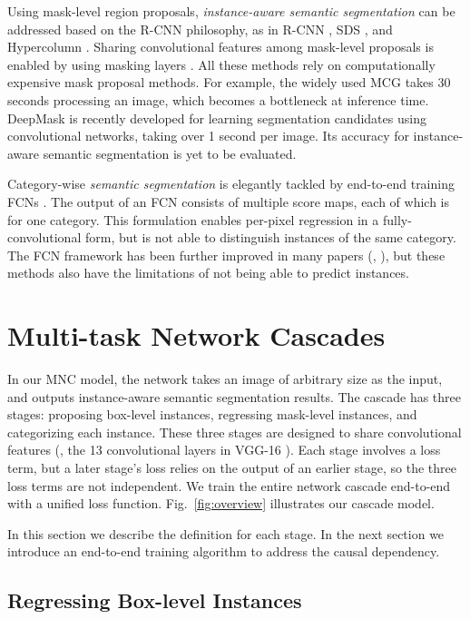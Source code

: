 \documentclass[10pt,twocolumn,letterpaper]{article}
\begin{document}
Using mask-level region proposals, \emph{instance-aware semantic segmentation} can be addressed based on the R-CNN philosophy, as in R-CNN \cite{Girshick2014}, SDS \cite{Hariharan2014}, and Hypercolumn \cite{Hariharan2015}. Sharing convolutional features among mask-level proposals is enabled by using masking layers \cite{Dai2015}. All these methods \cite{Girshick2014,Hariharan2014,Hariharan2015,Dai2015} rely on computationally expensive mask proposal methods. For example, the widely used MCG \cite{Arbelaez2014} takes 30 seconds processing an image, which becomes a bottleneck at inference time. DeepMask \cite{Pinheiro2015} is recently developed for learning segmentation candidates using convolutional networks, taking over 1 second per image. Its accuracy for instance-aware semantic segmentation is yet to be evaluated.

Category-wise \emph{semantic segmentation} is elegantly tackled by end-to-end training FCNs \cite{Long2015}. The output of an FCN consists of multiple score maps, each of which is for one category. This formulation enables per-pixel regression in a fully-convolutional form, but is not able to distinguish instances of the same category. The FCN framework has been further improved in many papers (\eg, \cite{Chen2015,Zheng2015}), but these methods also have the limitations of not being able to predict instances.

\section{Multi-task Network Cascades}

In our MNC model, the network takes an image of arbitrary size as the input, and outputs instance-aware semantic segmentation results. The cascade has three stages: proposing box-level instances, regressing mask-level instances, and categorizing each instance.
These three stages are designed to share convolutional features (\eg, the 13 convolutional layers in VGG-16 \cite{Simonyan2015}).
Each stage involves a loss term, but a later stage's loss relies on the output of an earlier stage, so the three loss terms are not independent. We train the entire network cascade end-to-end with a unified loss function.
Fig.~\ref{fig:overview} illustrates our cascade model.

In this section we describe the definition for each stage. In the next section we introduce an end-to-end training algorithm to address the causal dependency.

\subsection{Regressing Box-level Instances}
\end{document}
